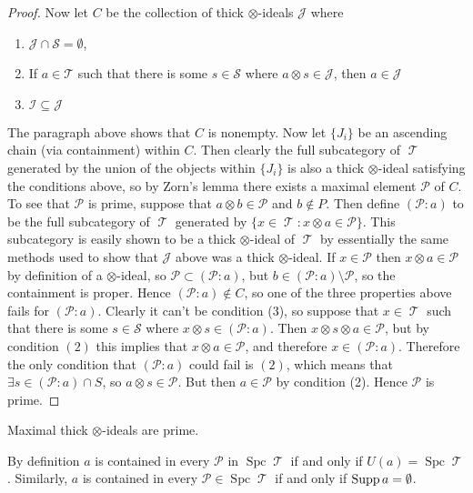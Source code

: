 \documentclass[11pt]{article}
\DeclareMathOperator{\TT}{\mathcal{T}}
\DeclareMathOperator{\spc}{Spc}
\begin{document}
\begin{proof}
Now let $C$ be the collection of thick $\otimes$-ideals $\mathcal{J}$ where 
\begin{enumerate}[(1)]
	\item $\mathcal{J} \cap \mathcal{S} = \emptyset$,
	\item If $a \in \mathcal{T}$ such that there is some $s \in \mathcal{S}$ where $a \otimes s \in \mathcal{J}$, then $a \in \mathcal{J}$
	\item $\mathcal{I} \subseteq \mathcal{J}$
\end{enumerate}
The paragraph above shows that $C$ is nonempty. Now let $\{J_i\}$ be an ascending chain (via containment) within $C$. Then clearly the full subcategory of $\TT$ generated by the union of the objects within $\{J_i\}$ is also a thick $\otimes$-ideal satisfying the conditions above, so by Zorn's lemma there exists a maximal element $\mathcal{P}$ of $C$. To see that $\mathcal{P}$ is prime, suppose that $a \otimes b \in \mathcal{P}$ and $b \not\in P$. Then define $(\mathcal{P}:a)$ to be the full subcategory of $\TT$ generated by $\{x \in \TT: x \otimes a \in \mathcal{P}\}$. This subcategory is easily shown to be a thick $\otimes$-ideal of $\TT$ by essentially the same methods used to show that $\mathcal{J}$ above was a thick $\otimes$-ideal. If $x \in \mathcal{P}$ then $x \otimes a \in \mathcal{P}$ by definition of a $\otimes$-ideal, so $\mathcal{P} \subset (\mathcal{P}: a)$, but $b \in (\mathcal{P}: a) \setminus \mathcal{P}$, so the containment is proper. Hence $(\mathcal{P}:a) \not\in C$, so one of the three properties above fails for $(\mathcal{P}:a)$. Clearly it can't be condition (3), so suppose that $x \in \TT$ such that there is some $s \in \mathcal{S}$ where $x \otimes s \in (\mathcal{P}: a)$. Then $x \otimes s \otimes a \in \mathcal{P}$, but by condition $(2)$ this implies that $x \otimes a \in \mathcal{P}$, and therefore $x \in (\mathcal{P}:a)$. Therefore the only condition that $(\mathcal{P}:a)$ could fail is $(2)$, which means that $\exists s \in (\mathcal{P}:a) \cap S$, so $a \otimes s \in \mathcal{P}$. But then $a \in \mathcal{P}$ by condition (2). Hence $\mathcal{P}$ is prime.
\end{proof}

\begin{cor}
Maximal thick $\otimes$-ideals are prime.
\end{cor}

By definition $a$ is contained in every $\mathcal{P}$ in $\spc \TT$ if and only if $U(a) = \spc \TT$. Similarly, $a$ is contained in every $\mathcal{P} \in \spc \TT$ if and only if $\operatorname{Supp} a = \emptyset$.
\end{document}
